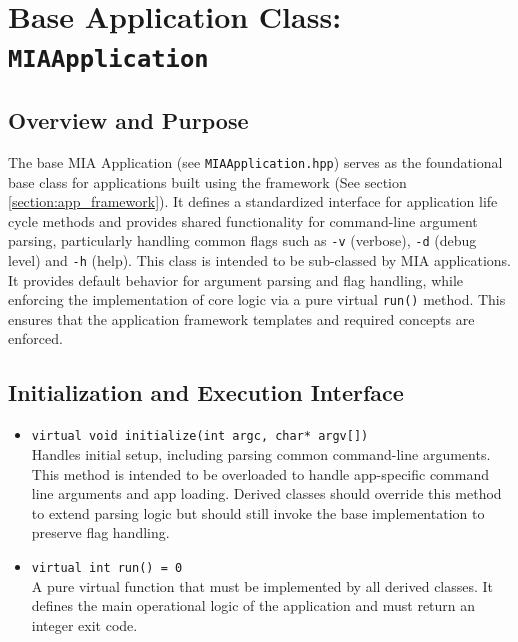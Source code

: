 \section{Base Application Class: \texttt{MIAApplication}}
\label{section:base_application}

\subsection*{Overview and Purpose}
The base MIA Application (see \texttt{MIAApplication.hpp}) serves as the foundational base class for applications built using the framework (See section \ref{section:app_framework}). It defines a standardized interface for application life cycle methods and provides shared functionality for command-line argument parsing, particularly handling common flags such as \texttt{-v} (verbose), \texttt{-d} (debug level) and \texttt{-h} (help). This class is intended to be sub-classed by MIA applications. It provides default behavior for argument parsing and flag handling, while enforcing the implementation of core logic via a pure virtual \texttt{run()} method. This ensures that the application framework templates and required concepts are enforced.

\subsection*{Initialization and Execution Interface}
\begin{itemize}\itemsep0em
	\item \texttt{virtual void initialize(int argc, char* argv[])} \\
	Handles initial setup, including parsing common command-line arguments. This method is intended to be overloaded to handle app-specific command line arguments and app loading. Derived classes should override this method to extend parsing logic but should still invoke the base implementation to preserve flag handling.
\end{itemize}

\begin{itemize}\itemsep0em
	\item \texttt{virtual int run() = 0} \\
	A pure virtual function that must be implemented by all derived classes. It defines the main operational logic of the application and must return an integer exit code.
\end{itemize}


